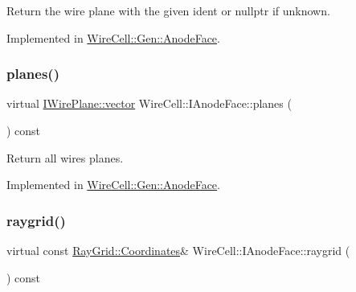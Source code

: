Return the wire plane with the given ident or nullptr if unknown. 



Implemented in \hyperlink{class_wire_cell_1_1_gen_1_1_anode_face_a6ed6d7c6614695d5ace93aa10b0d2478}{Wire\+Cell\+::\+Gen\+::\+Anode\+Face}.

\mbox{\label{class_wire_cell_1_1_i_anode_face_ae3ff56137d41a1ab6bf0dfa6892bd293}} 
\subsubsection{\texorpdfstring{planes()}{planes()}}
{\footnotesize\ttfamily virtual \hyperlink{class_wire_cell_1_1_i_component_a18978d88ce697af5941655a89660fd4e}{I\+Wire\+Plane\+::vector} Wire\+Cell\+::\+I\+Anode\+Face\+::planes (\begin{DoxyParamCaption}{ }\end{DoxyParamCaption}) const\hspace{0.3cm}{\ttfamily [pure virtual]}}



Return all wires planes. 



Implemented in \hyperlink{class_wire_cell_1_1_gen_1_1_anode_face_abfc7fb985b42b9f5ba891a8f6986d526}{Wire\+Cell\+::\+Gen\+::\+Anode\+Face}.

\mbox{\label{class_wire_cell_1_1_i_anode_face_a4f7bcaa754c5e72535d65568e9cb6c85}} 
\subsubsection{\texorpdfstring{raygrid()}{raygrid()}}
{\footnotesize\ttfamily virtual const \hyperlink{class_wire_cell_1_1_ray_grid_1_1_coordinates}{Ray\+Grid\+::\+Coordinates}\& Wire\+Cell\+::\+I\+Anode\+Face\+::raygrid (\begin{DoxyParamCaption}{ }\end{DoxyParamCaption}) const\hspace{0.3cm}{\ttfamily [pure virtual]}}



